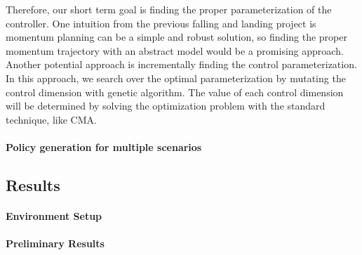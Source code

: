 Therefore, our short term goal is finding the proper parameterization
of the controller.
One intuition from the previous falling and landing project is
momentum planning can be a simple and robust solution, so finding the 
proper momentum trajectory with an abstract model would be 
a promising approach.
Another potential approach is incrementally finding the control 
parameterization. 
In this approach, we search over the optimal parameterization by 
mutating the control dimension with genetic algorithm.
The value of each control dimension will be determined by solving
the optimization problem with the standard technique, like CMA.


\paragraph{Policy generation for multiple scenarios}

\subsection{Results}

\paragraph{Environment Setup}

\paragraph{Preliminary Results}


